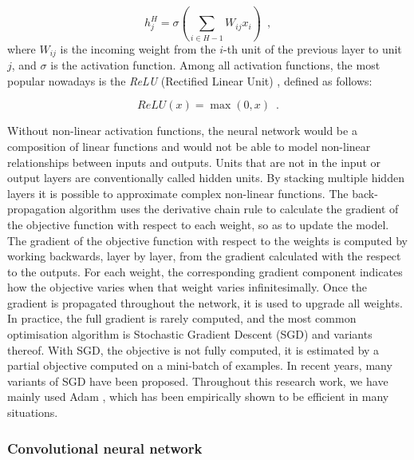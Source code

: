 \begin{equation*}
    h_j^H = \sigma\left(\sum_{i \in H-1}W_{ij}x_i\right)
    \enspace,
\end{equation*}
where $W_{ij}$ is the incoming weight from the $i$-th unit of the previous layer to unit $j$, and $\sigma$ is the activation function. Among all activation functions, the most popular nowadays is the \textit{ReLU} (Rectified Linear Unit) \citep{Glorot2011DeepSR}, defined as follows:

\begin{equation*}
    ReLU(x) = \max(0,x)
    \enspace.
\end{equation*}

Without non-linear activation functions, the neural network would be a composition of linear functions and would not be able to model non-linear relationships between inputs and outputs. Units that are not in the input or output layers are conventionally called hidden units. By stacking multiple hidden layers it is possible to approximate complex non-linear functions. The back-propagation algorithm uses the derivative chain rule to calculate the gradient of the objective function with respect to each weight, so as to update the model. The gradient of the objective function with respect to the weights is computed by working backwards, layer by layer, from the gradient calculated with the respect to the outputs. For each weight, the corresponding gradient component indicates how the objective varies when that weight varies infinitesimally. Once the gradient is propagated throughout the network, it is used to upgrade all weights. In practice, the full gradient is rarely computed, and the most common optimisation algorithm is Stochastic Gradient Descent (SGD) and variants thereof. With SGD, the objective is not fully computed, it is estimated by a partial objective computed on a mini-batch of examples.
In recent years, many variants of SGD have been proposed. Throughout this research work, we have mainly used Adam \citep{kingma2014adam}, which has been empirically shown to be efficient in many situations.

\subsubsection{Convolutional neural network} \label{Convolutional Neural Network}

